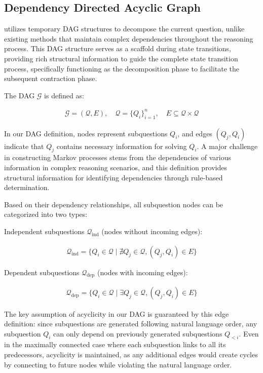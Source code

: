 \subsection{Dependency Directed Acyclic Graph}
\our utilizes temporary DAG structures to decompose the current question, unlike existing methods that maintain complex dependencies throughout the reasoning process. This DAG structure serves as a scaffold during state transitions, providing rich structural information to guide the complete state transition process, specifically functioning as the decomposition phase to facilitate the subsequent contraction phase.

The DAG $\mathcal{G}$ is defined as:

\begin{align}
\mathcal{G} = (\mathcal{Q}, E), \quad \mathcal{Q} = \{Q_i\}_{i=1}^n , \quad E \subseteq \mathcal{Q} \times \mathcal{Q} 
\end{align}

In our DAG definition, nodes represent subquestions $Q_i$, and edges $(Q_j, Q_i)$ indicate that $Q_j$ contains necessary information for solving $Q_i$. A major challenge in constructing Markov processes stems from the dependencies of various information in complex reasoning scenarios, and this definition provides structural information for identifying dependencies through rule-based determination.

Based on their dependency relationships, all subquestion nodes can be categorized into two types:

Independent subquestions $\mathcal{Q}_{\text{ind}}$ (nodes without incoming edges):

\begin{align}
\mathcal{Q}_{\text{ind}} = \{Q_i \in \mathcal{Q} \mid \nexists Q_j \in \mathcal{Q}, (Q_j, Q_i) \in E\}
\end{align}

Dependent subquestions $\mathcal{Q}_{\text{dep}}$ (nodes with incoming edges):

\begin{align}
\mathcal{Q}_{\text{dep}} = \{Q_i \in \mathcal{Q} \mid \exists Q_j \in \mathcal{Q}, (Q_j, Q_i) \in E\}
\end{align}

The key assumption of acyclicity in our DAG is guaranteed by this edge definition: since subquestions are generated following natural language order, any subquestion $Q_i$ can only depend on previously generated subquestions $Q_{<i}$. Even in the maximally connected case where each subquestion links to all its predecessors, acyclicity is maintained, as any additional edges would create cycles by connecting to future nodes while violating the natural language order.

